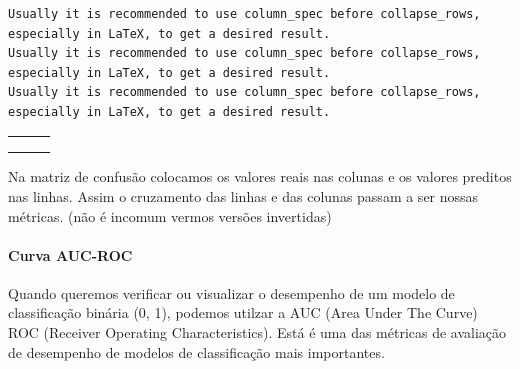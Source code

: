 \documentclass[
  letterpaper,
  DIV=11,
  numbers=noendperiod]{scrreprt}
\let\oldparagraph\paragraph
\renewcommand{\paragraph}[1]{\oldparagraph{#1}\mbox{}}
\begin{document}
\begin{verbatim}
Usually it is recommended to use column_spec before collapse_rows, especially in LaTeX, to get a desired result. 
Usually it is recommended to use column_spec before collapse_rows, especially in LaTeX, to get a desired result. 
Usually it is recommended to use column_spec before collapse_rows, especially in LaTeX, to get a desired result. 
\end{verbatim}

\begin{table}
\centering\begingroup\fontsize{20}{22}\selectfont

\begin{tabular}{>{\raggedright\arraybackslash}p{3in}|>{\raggedright\arraybackslash}p{3in}|>{\raggedright\arraybackslash}p{2in}}
\hline
\multicolumn{1}{c|}{\cellcolor{white}{ }} & \multicolumn{2}{c}{\cellcolor{white}{Observado}} \\
\cline{2-3}
\multicolumn{1}{center}{\cellcolor{white}{Predito}} & \multicolumn{1}{center}{\cellcolor{white}{Negativo     }} & \multicolumn{1}{center}{\cellcolor{white}{Positivo }}\\
\hline
\textbf{\multicolumn{1}{center}{\cellcolor{white}{Negativo}}} & \multicolumn{1}{center}{\cellcolor{white}{Verdadeiro Negativo (TN)}} & \multicolumn{1}{center}{\cellcolor{white}{Falso Negativo (FN)}}\\
\cline{1-3}
\textbf{\multicolumn{1}{center}{\cellcolor{white}{Positivo}}} & \multicolumn{1}{center}{\cellcolor{white}{Falso Positivo (FP)}} & \multicolumn{1}{center}{\cellcolor{white}{Verdadeiro Positivo (TP)}}\\
\hline
\end{tabular}
\endgroup{}
\end{table}

Na matriz de confusão colocamos os valores reais nas colunas e os
valores preditos nas linhas. Assim o cruzamento das linhas e das colunas
passam a ser nossas métricas. (não é incomum vermos versões invertidas)

\hypertarget{curva-auc-roc}{%
\paragraph{Curva AUC-ROC}\label{curva-auc-roc}}

Quando queremos verificar ou visualizar o desempenho de um modelo de
classificação binária (0, 1), podemos utilzar a AUC (Area Under The
Curve) ROC (Receiver Operating Characteristics). Está é uma das métricas
de avaliação de desempenho de modelos de classificação mais importantes.
\end{document}
